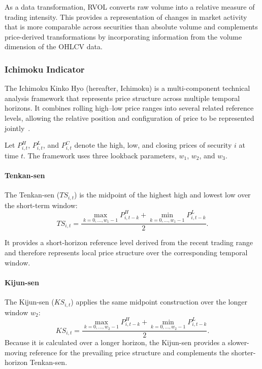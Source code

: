 \medskip

As a data transformation, RVOL converts raw volume into a relative measure of trading intensity. This provides a representation of changes in market activity that is more comparable across securities than absolute volume and complements price-derived transformations by incorporating information from the volume dimension of the \acs{OHLCV} data.
\subsubsection{Ichimoku Indicator}

The Ichimoku Kinko Hyo (hereafter, Ichimoku) is a multi-component technical analysis framework that represents price structure across multiple temporal horizons. It combines rolling high--low price ranges into several related reference levels, allowing the relative position and configuration of price to be represented jointly~\cite{Cahyadi2012,Deng2021}.

Let $P_{i,t}^{H}$, $P_{i,t}^{L}$, and $P_{i,t}^{C}$ denote the high, low, and closing prices of security $i$ at time $t$. The framework uses three lookback parameters, $w_1$, $w_2$, and $w_3$.

\paragraph{Tenkan-sen}
The Tenkan-sen ($TS_{i,t}$) is the midpoint of the highest high and lowest low over the short-term window:
\begin{equation}
	TS_{i,t}=\frac{\max_{k=0,\ldots,w_1-1}P_{i,t-k}^{H}+\min_{k=0,\ldots,w_1-1}P_{i,t-k}^{L}}{2}.
\end{equation}

It provides a short-horizon reference level derived from the recent trading range and therefore represents local price structure over the corresponding temporal window.

\paragraph{Kijun-sen}
The Kijun-sen ($KS_{i,t}$) applies the same midpoint construction over the longer window $w_2$:
\begin{equation}
	KS_{i,t}=\frac{\max_{k=0,\ldots,w_2-1}P_{i,t-k}^{H}+\min_{k=0,\ldots,w_2-1}P_{i,t-k}^{L}}{2}.
\end{equation}
Because it is calculated over a longer horizon, the Kijun-sen provides a slower-moving reference for the prevailing price structure and complements the shorter-horizon Tenkan-sen.

